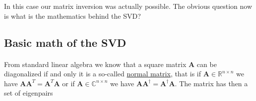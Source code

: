 \documentclass[%
oneside,                 %
final,                   %
10pt]{article}
\begin{document}
In this case our matrix inversion was actually possible. The obvious question now is what is the mathematics behind the SVD?


\subsection{Basic math of the SVD}

\paragraph{}

From standard linear algebra we know that a square matrix $\bm{A}$ can be diagonalized if and only it is 
a so-called \href{{https://en.wikipedia.org/wiki/Normal_matrix}}{normal matrix}, that is if $\bm{A}\in {\mathbb{R}}^{n\times n}$
we have $\bm{A}\bm{A}^T=\bm{A}^T\bm{A}$ or if $\bm{A}\in {\mathbb{C}}^{n\times n}$ we have $\bm{A}\bm{A}^{\dagger}=\bm{A}^{\dagger}\bm{A}$.
The matrix has then a set of eigenpairs 
\end{document}
